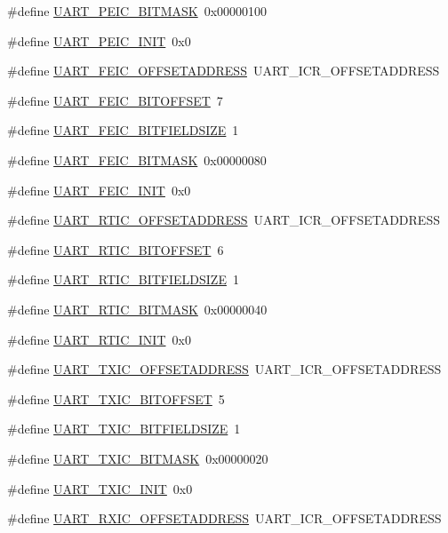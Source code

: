 \begin{DoxyCompactItemize}
\item 
\#define \hyperlink{a00575_a79e5cacee21f37538f8e517dd5f183bd}{UART\_\-PEIC\_\-BITMASK}~0x00000100
\item 
\#define \hyperlink{a00575_a59f4771ece7172bf1823eb697b79f6b0}{UART\_\-PEIC\_\-INIT}~0x0
\item 
\#define \hyperlink{a00575_a7539d0ad277164cc77056b203c39955c}{UART\_\-FEIC\_\-OFFSETADDRESS}~UART\_\-ICR\_\-OFFSETADDRESS
\item 
\#define \hyperlink{a00575_ad1fb4ef210b82c39af9d5339b87ee109}{UART\_\-FEIC\_\-BITOFFSET}~7
\item 
\#define \hyperlink{a00575_a840c3d8f6e8f1dd0d44e94a7bbd08247}{UART\_\-FEIC\_\-BITFIELDSIZE}~1
\item 
\#define \hyperlink{a00575_af2844e2f6bf29eded5d7d4c9fe4073a6}{UART\_\-FEIC\_\-BITMASK}~0x00000080
\item 
\#define \hyperlink{a00575_aa2908bf121ac85adc4db6e4ce5501dc0}{UART\_\-FEIC\_\-INIT}~0x0
\item 
\#define \hyperlink{a00575_a7a6dddeb1367d7f40535315b0872df1a}{UART\_\-RTIC\_\-OFFSETADDRESS}~UART\_\-ICR\_\-OFFSETADDRESS
\item 
\#define \hyperlink{a00575_ab43f4d13c4a0c2e9fd693cdabea3e267}{UART\_\-RTIC\_\-BITOFFSET}~6
\item 
\#define \hyperlink{a00575_a6ab1765805c0b649e3023cffbdf8b03c}{UART\_\-RTIC\_\-BITFIELDSIZE}~1
\item 
\#define \hyperlink{a00575_a85069edee0debd390ba0338c2875a5b0}{UART\_\-RTIC\_\-BITMASK}~0x00000040
\item 
\#define \hyperlink{a00575_a935704bd49999ac4d399dbc965fe0ed2}{UART\_\-RTIC\_\-INIT}~0x0
\item 
\#define \hyperlink{a00575_aa91ef20e0b10a0aac7c44b4027cb256f}{UART\_\-TXIC\_\-OFFSETADDRESS}~UART\_\-ICR\_\-OFFSETADDRESS
\item 
\#define \hyperlink{a00575_a349d25bc384d61de5528f66981e32e8a}{UART\_\-TXIC\_\-BITOFFSET}~5
\item 
\#define \hyperlink{a00575_a3df30e1b7b6741ed9b9ba3644deabc7b}{UART\_\-TXIC\_\-BITFIELDSIZE}~1
\item 
\#define \hyperlink{a00575_a76b1256c8fa610b72e1bd0f8c56b0887}{UART\_\-TXIC\_\-BITMASK}~0x00000020
\item 
\#define \hyperlink{a00575_a19e9bda2e0c95b22127cb7746fee6b60}{UART\_\-TXIC\_\-INIT}~0x0
\item 
\#define \hyperlink{a00575_a782a5b2f7aa71ed8d4c54eca25228f1c}{UART\_\-RXIC\_\-OFFSETADDRESS}~UART\_\-ICR\_\-OFFSETADDRESS

\end{DoxyCompactItemize}
